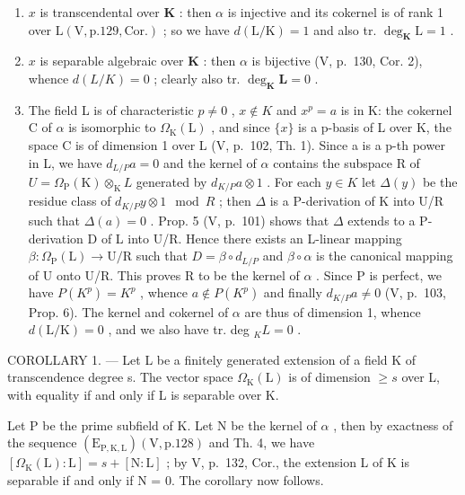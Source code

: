 \begin{enumerate}
\def\labelenumi{\alph{enumi})}
\item
  \(x\) is transcendental over \(\mathbf{K}\) : then \(\alpha\) is injective and its cokernel is of rank 1 over \(\mathrm{L}(\mathrm{V},\mathrm{p}.129,\mathrm{Cor.})\) ; so we have \(d(\mathrm{L} / \mathrm{K}) = 1\) and also tr. \(\deg_{\mathbf{K}}\mathrm{L} = 1\) .
\item
  \(x\) is separable algebraic over \(\mathbf{K}\) : then \(\alpha\) is bijective (V, p.~130, Cor. 2), whence \(d(L / K) = 0\) ; clearly also tr. \(\deg_{\mathbf{K}}\mathbf{L} = 0\) .
\item
  The field L is of characteristic \(p \neq 0\) , \(x \notin K\) and \(x^{p} = a\) is in K: the cokernel C of \(\alpha\) is isomorphic to \(\Omega_{\mathrm{K}}(\mathrm{L})\) , and since \(\{x\}\) is a p-basis of L over K, the space C is of dimension 1 over L (V, p.~102, Th. 1). Since a is a p-th power in L, we have \(d_{L/P}a = 0\) and the kernel of \(\alpha\) contains the subspace R of \(U = \Omega_{\mathrm{P}}(\mathrm{K}) \otimes_{\mathrm{K}} L\) generated by \(d_{K/P}a \otimes 1\) . For each \(y \in K\) let \(\Delta(y)\) be the residue class of \(d_{K/P}y \otimes 1 \mod R\) ; then \(\Delta\) is a P-derivation of K into U/R such that \(\Delta(a) = 0\) . Prop. 5 (V, p.~101) shows that \(\Delta\) extends to a P-derivation D of L into U/R. Hence there exists an L-linear mapping \(\beta : \Omega_{\mathrm{P}}(\mathrm{L}) \to \mathrm{U}/\mathrm{R}\) such that \(D = \beta \circ d_{L/P}\) and \(\beta \circ \alpha\) is the canonical mapping of U onto U/R. This proves R to be the kernel of \(\alpha\) . Since P is perfect, we have \(P(K^{p}) = K^{p}\) , whence \(a \notin P(K^{p})\) and finally \(d_{K/P}a \neq 0\) (V, p.~103, Prop. 6). The kernel and cokernel of \(\alpha\) are thus of dimension 1, whence \(d(\mathrm{L}/\mathrm{K}) = 0\) , and we also have tr. deg \(_{K}L = 0\) .
\end{enumerate}

COROLLARY 1. --- Let L be a finitely generated extension of a field K of transcendence degree s. The vector space \(\Omega_{\mathrm{K}}(\mathrm{L})\) is of dimension \(\geqslant s\) over L, with equality if and only if L is separable over K.

Let P be the prime subfield of K. Let N be the kernel of \(\alpha\) , then by exactness of the sequence \((\mathrm{E}_{\mathrm{P},\mathrm{K},\mathrm{L}})(\mathrm{V},\mathrm{p}.128)\) and Th. 4, we have \([\Omega_{\mathrm{K}}(\mathrm{L}):\mathrm{L}] = s + [\mathrm{N}:\mathrm{L}]\) ; by V, p.~132, Cor., the extension L of K is separable if and only if N = 0. The corollary now follows.

